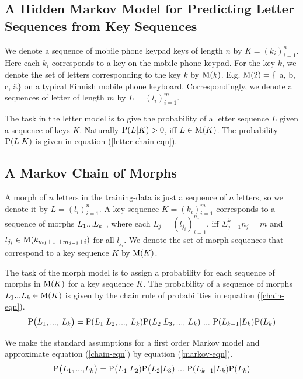 \documentclass{llncs}
\begin{document}
\subsection{A Hidden Markov Model for Predicting Letter Sequences from Key Sequences}

We denote a sequence of mobile phone keypad keys of length $n$ by $K =
(k_i)_{i=1}^{n}$. Here each $k_i$ corresponds to a key on the mobile
phone keypad. For the key $k$, we denote the set of letters
corresponding to the key $k$ by ${\rm M}(k)$. E.g. ${\rm M}(2) = \{$
a, b, c, \"{a}$\}$ on a typical Finnish mobile phone
keyboard. Correspondingly, we denote a sequences of letter of length
$m$ by $L = (l_i)_{i=1}^{m}$.

The task in the letter model is to give the probability of a letter
sequence $L$ given a sequence of keys $K$. Naturally ${\rm P}(L|K) > 0$, iff
$L \in {\rm M}(K)$. The probability ${\rm P}(L|K)$ is given in equation (\ref{letter-chain-eqn}).  


\subsection{A Markov Chain of Morphs}

A morph of $n$ letters in the training-data is just a sequence of $n$
letters, so we denote it by $L = (l_i)_{i=1}^{n}$. A key sequence $K =
(k_i)_{i=1}^{m}$ corresponds to a sequence of morphs $L_1{\rm
  ... }L_k$ , where each $L_j = (l_{j_i})_{i=1}^{n_j}$, iff $\Sigma_{j
  = 1}^{k} n_j = m$ and $l_{j_i} \in {\rm M}(k_{m_1 + {\rm ... } +
  m_{j - 1} + i})$ for all $l_{j_i}$. We denote the set of morph
sequences that correspond to a key sequence $K$ by ${\rm M}(K)$.

The task of the morph model is to assign a probability for each
sequence of morphs in ${\rm M}(K)$ for a key sequence $K$. The
probability of a sequence of morphs $L_1{\rm ... }L_k \in {\rm M}(K)$
is given by the chain rule of probabilities in equation
(\ref{chain-eqn}).
\begin{equation}\label{chain-eqn}
{\rm P}\big(L_1{\rm, ..., }\ L_k\big) = {\rm P}(L_1 | L_2 {\rm, ..., }\ L_k) {\rm P}(L_2 | L_3 {\rm, ..., }\ L_k)\ {\rm ... }\ {\rm P}(L_{k-1} | L_k){\rm P}(L_k)
\end{equation}

We make the standard assumptions for a first order Markov model and approximate equation (\ref{chain-eqn}) by equation (\ref{markov-eqn}).
\begin{equation}\label{markov-eqn}
{\rm P}\big(L_1{\rm, ..., }L_k\big) = {\rm P}\big(L_1 | L_2){\rm P}\big(L_2 | L_3)\ {\rm ... }\ {\rm P}(L_{k-1} | L_k){\rm P}(L_k)
\end{equation}
\end{document}
